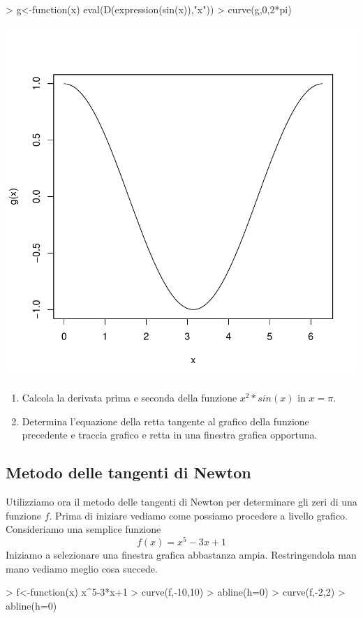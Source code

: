 \documentclass[onecolumn,11pt]{book}
\begin{document}
\begin{Schunk}
\begin{Sinput}
> g<-function(x) eval(D(expression(sin(x)),"x"))
> curve(g,0,2*pi)
\end{Sinput}
\end{Schunk}
\includegraphics{statisticaconR-102}
\begin{shaded}
\begin{enumerate}
 \item{} Calcola la derivata prima e seconda della funzione $x^2*sin(x)$ in $x=\pi$.
 \item{} Determina l'equazione della retta tangente al grafico della funzione precedente e traccia grafico e retta in una finestra grafica opportuna.
\end{enumerate}
\end{shaded} 
 \subsection{Metodo delle tangenti di Newton}
Utilizziamo ora il metodo delle tangenti di Newton per determinare gli zeri di una funzione $f$. Prima di iniziare vediamo come possiamo procedere a livello grafico. 
Consideriamo una semplice funzione  $$ f(x)= x^5-3x+1$$
Iniziamo a selezionare una finestra grafica abbastanza ampia. Restringendola man mano vediamo meglio cosa succede.
\begin{Schunk}
\begin{Sinput}
> f<-function(x) x^5-3*x+1
> curve(f,-10,10) 
> abline(h=0)
> curve(f,-2,2)
> abline(h=0)
\end{Sinput}
\end{Schunk}
\end{document}
